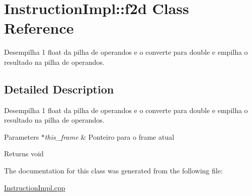 \hypertarget{class_instruction_impl_1_1f2d}{}\section{Instruction\+Impl\+:\+:f2d Class Reference}
\label{class_instruction_impl_1_1f2d}


Desempilha 1 float da pilha de operandos e o converte para double e empilha o resultado na pilha de operandos.  




\subsection{Detailed Description}
Desempilha 1 float da pilha de operandos e o converte para double e empilha o resultado na pilha de operandos. 


\begin{DoxyParams}{Parameters}
{\em $\ast$this\+\_\+frame} & Ponteiro para o frame atual \\
\hline
\end{DoxyParams}
\begin{DoxyReturn}{Returns}
void 
\end{DoxyReturn}


The documentation for this class was generated from the following file\+:\begin{DoxyCompactItemize}
\item 
\hyperlink{_instruction_impl_8cpp}{Instruction\+Impl.\+cpp}\end{DoxyCompactItemize}

